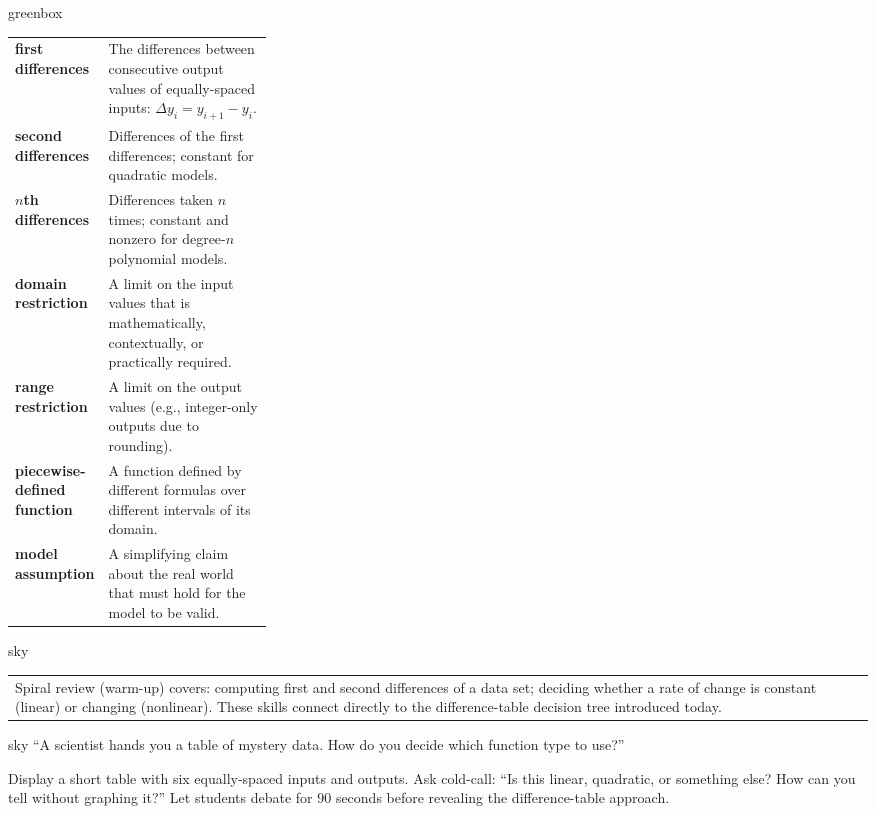 \documentclass[10pt]{article}
\begin{document}
\begin{skillbox}{greenbox}
\renewcommand{\arraystretch}{1.4}
\begin{tabularx}{\linewidth}{@{} >{\bfseries\color{navy}}p{0.30\linewidth} X @{}}
first differences    & The differences between consecutive output values of equally-spaced inputs: $\Delta y_i = y_{i+1} - y_i$. \\
second differences   & Differences of the first differences; constant for quadratic models. \\
$n$th differences    & Differences taken $n$ times; constant and nonzero for degree-$n$ polynomial models. \\
domain restriction   & A limit on the input values that is mathematically, contextually, or practically required. \\
range restriction    & A limit on the output values (e.g., integer-only outputs due to rounding). \\
piecewise-defined function & A function defined by different formulas over different intervals of its domain. \\
model assumption     & A simplifying claim about the real world that must hold for the model to be valid. \\
\end{tabularx}
\end{skillbox}

\begin{skillbox}{sky}
    \begin{tabularx}{\linewidth}{@{}X@{}}
        Spiral review (warm-up) covers: computing first and second differences of a data set;
        deciding whether a rate of change is constant (linear) or changing (nonlinear).
        These skills connect directly to the difference-table decision tree introduced today.
    \end{tabularx}
\end{skillbox}

\begin{skillbox}[Hook]{sky}
``A scientist hands you a table of mystery data. How do you decide which function type to use?''

\medskip
Display a short table with six equally-spaced inputs and outputs. Ask cold-call: ``Is this
linear, quadratic, or something else? How can you tell without graphing it?'' Let students
debate for 90 seconds before revealing the difference-table approach.
\end{skillbox}
\end{document}

